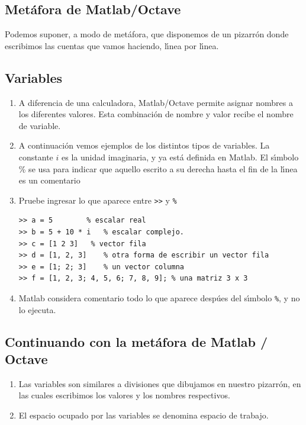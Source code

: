 \subsection{Met\'{a}fora de Matlab/Octave}

Podemos suponer, a modo de met\'{a}fora, que disponemos de un
pizarr\'{o}n donde escribimos las cuentas que vamos haciendo,
l\'{\i}nea por l\'{\i}nea.

\subsection{Variables}

\begin{enumerate}

\item A diferencia de una calculadora, Matlab/Octave permite asignar nombres
  a los diferentes valores. Esta combinaci\'{o}n de nombre y valor
  recibe el nombre de variable.

\item A continuaci\'{o}n vemos ejemplos de los distintos tipos de variables.
La constante $i$ es la unidad imaginaria, y ya est\'{a} definida en
Matlab. El s\'{\i}mbolo \% se usa para indicar que aquello escrito a
su derecha hasta el fin de la l\'{\i}nea es un comentario

\item Pruebe ingresar lo que aparece entre \verb->>- y \verb-%-
\begin{verbatim}
>> a = 5        % escalar real
>> b = 5 + 10 * i   % escalar complejo.
>> c = [1 2 3]   % vector fila
>> d = [1, 2, 3]    % otra forma de escribir un vector fila
>> e = [1; 2; 3]    % un vector columna
>> f = [1, 2, 3; 4, 5, 6; 7, 8, 9]; % una matriz 3 x 3
\end{verbatim}

\item Matlab considera comentario todo lo que aparece desp\'{u}es del s\'{\i}mbolo
  \verb-%-, y no lo ejecuta.

\end{enumerate}

\subsection{Continuando con la met\'{a}fora de Matlab / Octave}

\begin{enumerate}
\item Las variables son similares a divisiones que dibujamos en nuestro
pizarr\'{o}n, en las cuales escribimos los valores y los nombres
respectivos.

\item El espacio ocupado por las variables se denomina espacio de
  trabajo.
\end{enumerate}

